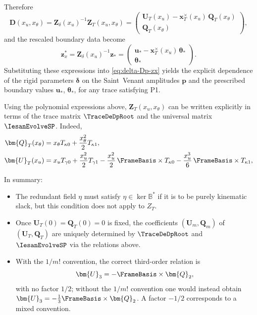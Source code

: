\begin{Aside}
Therefore
\begin{equation*}
  \mathbf{D}(x_u,x_\theta)
  =
  \bm{Z}_{\delta}(x_u)^{-1}\bm{Z}_T(x_u,x_\theta)
  =
  \begin{pmatrix}
    \bm{U}_T(x_u) - \bm{x}_T^{\times}(x_u)\,\bm{Q}_T(x_\theta) \\
    \bm{Q}_T(x_\theta)
  \end{pmatrix},
\end{equation*}
and the rescaled boundary data become
\begin{equation*}
  \bm{z}_x^*
  =
  \bm{Z}_{\delta}(x_u)^{-1}\bm{z}_*
  =
  \begin{pmatrix}
    \bm{u}_* - \bm{x}_T^{\times}(x_u)\,\bm{\theta}_* \\
    \bm{\theta}_*
  \end{pmatrix}.
\end{equation*}
Substituting these expressions into \eqref{eq:delta-Dp-zx} yields the explicit
dependence of the rigid parameters \(\bm{\delta}\) on the Saint~Venant
amplitudes \(\bm{p}\) and the prescribed boundary values \(\bm{u}_*\),
\(\bm{\theta}_*\), for any trace satisfying P1.

Using the polynomial expressions above, $\bm{Z}_T(x_u,x_\theta)$ can be written explicitly in terms of the trace matrix $\TraceDeDpRoot$ and the universal matrix $\IesanEvolveSP$. 
Indeed,
\[
\begin{aligned}
  \bm{Q}_T(x_\theta)
  &= x_\theta T_{\kappa 0} + \frac{x_\theta^2}{2}T_{\kappa 1},
\\
  \bm{U}_T(x_u)
  &= x_u T_{\gamma 0}
    + \frac{x_u^2}{2}T_{\gamma 1}
    - \frac{x_u^2}{2}\,\FrameBasis\times T_{\kappa 0}
    - \frac{x_u^3}{6}\,\FrameBasis\times T_{\kappa 1},
\end{aligned}
\]

In summary:
\begin{itemize}
  \item The redundant field $\eta$ must satisfy $\eta\in\ker\mathbb{B}^*$ if it is to be purely kinematic slack, but this condition does not apply to $Z_T$.
  \item Once $\bm{U}_T(0)=\bm{Q}_T(0)=0$ is fixed, the coefficients $(\bm{U}_m,\bm{Q}_m)$ of $(\bm{U}_T,\bm{Q}_T)$ are uniquely determined by $\TraceDeDpRoot$ and $\IesanEvolveSP$ via the relations above.
  \item With the $1/m!$ convention, the correct third-order relation is
  \[
    \bm{U}_3 = -\FrameBasis\times \bm{Q}_2,
  \]
  with no factor $1/2$; without the $1/m!$ convention one would instead obtain
  $\bm{U}_3 = -\tfrac{1}{3}\FrameBasis\times \bm{Q}_2$. 
  A factor $-1/2$ corresponds to a mixed convention.
\end{itemize}

\end{Aside}
